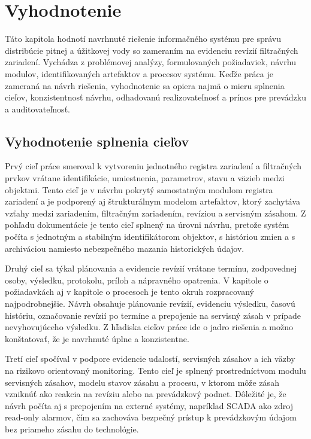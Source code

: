 
\chapter{Vyhodnotenie}\label{ch:evaluation}

Táto kapitola hodnotí navrhnuté riešenie informačného systému pre správu distribúcie pitnej a úžitkovej vody so zameraním na evidenciu revízií filtračných zariadení. Vychádza z problémovej analýzy, formulovaných požiadaviek, návrhu modulov, identifikovaných artefaktov a procesov systému. Keďže práca je zameraná na návrh riešenia, vyhodnotenie sa opiera najmä o mieru splnenia cieľov, konzistentnosť návrhu, odhadovanú realizovateľnosť a prínos pre prevádzku a auditovateľnosť.

\section{Vyhodnotenie splnenia cieľov}

Prvý cieľ práce smeroval k vytvoreniu jednotného registra zariadení a filtračných prvkov vrátane identifikácie, umiestnenia, parametrov, stavu a väzieb medzi objektmi. Tento cieľ je v návrhu pokrytý samostatným modulom registra zariadení a je podporený aj štrukturálnym modelom artefaktov, ktorý zachytáva vzťahy medzi zariadením, filtračným zariadením, revíziou a servisným zásahom. Z pohľadu dokumentácie je tento cieľ splnený na úrovni návrhu, pretože systém počíta s jednotným a stabilným identifikátorom objektov, s históriou zmien a s archiváciou namiesto nebezpečného mazania historických údajov.

Druhý cieľ sa týkal plánovania a evidencie revízií vrátane termínu, zodpovednej osoby, výsledku, protokolu, príloh a nápravného opatrenia. V kapitole o požiadavkách aj v kapitole o procesoch je tento okruh rozpracovaný najpodrobnejšie. Návrh obsahuje plánovanie revízií, evidenciu výsledku, časovú históriu, označovanie revízií po termíne a prepojenie na servisný zásah v prípade nevyhovujúceho výsledku. Z hľadiska cieľov práce ide o jadro riešenia a možno konštatovať, že je navrhnuté úplne a konzistentne.

Tretí cieľ spočíval v podpore evidencie udalostí, servisných zásahov a ich väzby na rizikovo orientovaný monitoring. Tento cieľ je splnený prostredníctvom modulu servisných zásahov, modelu stavov zásahu a procesu, v ktorom môže zásah vzniknúť ako reakcia na revíziu alebo na prevádzkový podnet. Dôležité je, že návrh počíta aj s prepojením na externé systémy, napríklad SCADA ako zdroj read-only alarmov, čím sa zachováva bezpečný prístup k prevádzkovým údajom bez priameho zásahu do technológie.

